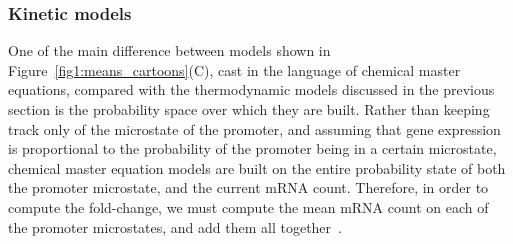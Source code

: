 \subsubsection{Kinetic models}
One of the main difference between models shown in
Figure~\ref{fig1:means_cartoons}(C), cast in the language of chemical master
equations, compared with the thermodynamic models discussed in the previous
section is the probability space over which they are built. Rather than keeping
track only of the microstate of the promoter, and assuming that gene expression
is proportional to the probability of the promoter being in a certain
microstate, chemical master equation models are built on the entire probability
state of both the promoter microstate, and the current mRNA count. Therefore, in
order to compute the fold-change, we must compute the mean mRNA count on each of
the promoter microstates, and add them all together~\cite{Sanchez2013}.

